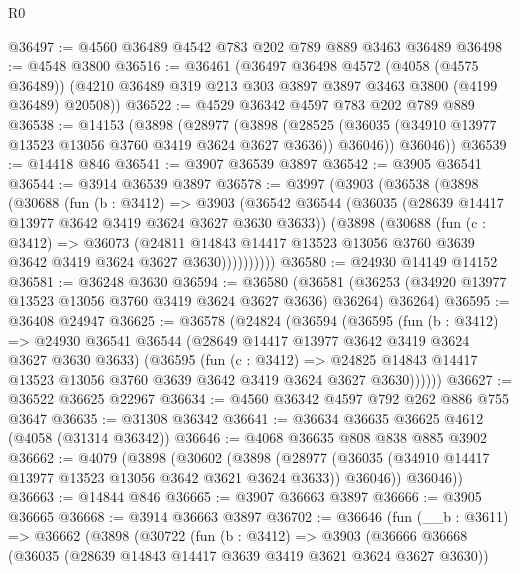 \begin{lexlean}{R0}
\begin{coremodule}
@36497 := @4560 @36489 @4542 @783 @202 @789 @889 @3463 @36489
@36498 := @4548 @3800
@36516 := @36461
    (@36497
      @36498
      @4572
      (@4058 (@4575 @36489))
      (@4210 @36489 @319 @213 @303 @3897 @3897 @3463 @3800 (@4199 @36489) @20508))
@36522 := @4529 @36342 @4597 @783 @202 @789 @889
@36538 := @14153
    (@3898
      (@28977
        (@3898 (@28525 (@36035 (@34910 @13977 @13523 @13056 @3760 @3419 @3624 @3627 @3636)) @36046))
        @36046))
@36539 := @14418 @846
@36541 := @3907 @36539 @3897
@36542 := @3905 @36541
@36544 := @3914 @36539 @3897
@36578 := @3997
    (@3903
      (@36538
        (@3898
          (@30688
            (fun (b : @3412) =>
            @3903
              (@36542
                @36544
                (@36035 (@28639 @14417 @13977 @3642 @3419 @3624 @3627 @3630 @3633))
                (@3898
                  (@30688
                    (fun (c : @3412) =>
                    @36073
                      (@24811
                        @14843
                        @14417
                        @13523
                        @13056
                        @3760
                        @3639
                        @3642
                        @3419
                        @3624
                        @3627
                        @3630))))))))))
@36580 := @24930 @14149 @14152
@36581 := @36248 @3630
@36594 := @36580
    (@36581 (@36253 (@34920 @13977 @13523 @13056 @3760 @3419 @3624 @3627 @3636) @36264) @36264)
@36595 := @36408 @24947
@36625 := @36578
    (@24824
      (@36594
        (@36595
          (fun (b : @3412) =>
          @24930
            @36541
            @36544
            (@28649 @14417 @13977 @3642 @3419 @3624 @3627 @3630 @3633)
            (@36595
              (fun (c : @3412) =>
              @24825 @14843 @14417 @13523 @13056 @3760 @3639 @3642 @3419 @3624 @3627 @3630))))))
@36627 := @36522 @36625 @22967
@36634 := @4560 @36342 @4597 @792 @262 @886 @755 @3647
@36635 := @31308 @36342
@36641 := @36634 @36635 @36625 @4612 (@4058 (@31314 @36342))
@36646 := @4068 @36635 @808 @838 @885 @3902
@36662 := @4079
    (@3898
      (@30602
        (@3898
          (@28977 (@36035 (@34910 @14417 @13977 @13523 @13056 @3642 @3621 @3624 @3633)) @36046))
        @36046))
@36663 := @14844 @846
@36665 := @3907 @36663 @3897
@36666 := @3905 @36665
@36668 := @3914 @36663 @3897
@36702 := @36646
    (fun (__b : @3611) =>
    @36662
      (@3898
        (@30722
          (fun (b : @3412) =>
          @3903
            (@36666
              @36668
              (@36035 (@28639 @14843 @14417 @3639 @3419 @3621 @3624 @3627 @3630))

\end{coremodule}
\end{lexlean}

